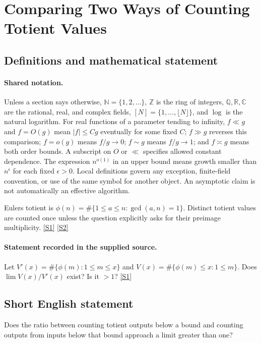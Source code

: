 \documentclass[11pt,a4paper]{article}
\newcommand{\N}{\mathbb{N}}
\newcommand{\Z}{\mathbb{Z}}
\newcommand{\Q}{\mathbb{Q}}
\newcommand{\R}{\mathbb{R}}
\newcommand{\C}{\mathbb{C}}
\newcommand{\sref}[2]{\hyperlink{source:#1:#2}{[S#2]}}
\begin{document}
\section{Comparing Two Ways of Counting Totient Values}\label{statement}


\subsection{Definitions and mathematical statement}

\paragraph{Shared notation.}Unless a section says otherwise, $\N=\{1,2,\ldots\}$,
$\Z$ is the ring of integers, $\Q,\R,\C$ are the rational, real, and complex
fields, $[N]=\{1,\ldots,\lfloor N\rfloor\}$, and $\log$ is the natural
logarithm. For real functions of a parameter tending to infinity,
$f\ll g$ and $f=O(g)$ mean $|f|\leq Cg$ eventually for some fixed $C$;
$f\gg g$ reverses this comparison; $f=o(g)$ means $f/g\to0$;
$f\sim g$ means $f/g\to1$; and $f\asymp g$ means both order bounds.
A subscript on $O$ or $\ll$ specifies allowed constant dependence.
The expression $n^{o(1)}$ in an upper bound means growth smaller than
$n^\epsilon$ for each fixed $\epsilon>0$. Local definitions govern any
exception, finite-field convention, or use of the same symbol for another
object. An asymptotic claim is not automatically an effective algorithm.



Euler\textquotesingle s totient is $\phi(n)=\#\{1\leq a\leq n:\gcd(a,n)=1\}$. Distinct totient values are counted once unless the question explicitly asks for their preimage multiplicity. \sref{statement}{1} \sref{statement}{2}

\paragraph{Statement recorded in the supplied source.}
Let $ V'(x)=\#\{\phi(m) : 1\leq m\leq x\} $ and $ V(x)=\#\{\phi(m) \leq x : 1\leq m\}. $ Does $\lim V(x)/V'(x)$ exist? Is it $>1$? \sref{statement}{1}

\subsection{Short English statement}

Does the ratio between counting totient outputs below a bound and counting outputs from inputs below that bound approach a limit greater than one?
\end{document}
